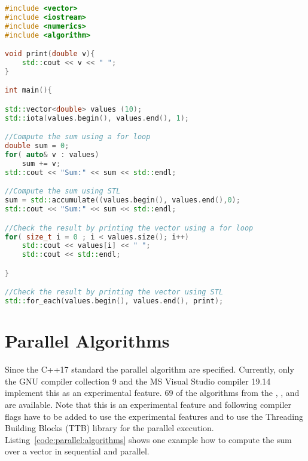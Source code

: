 \begin{lstlisting}[language=c++,caption={Example for a function definition to compute the maximum of two numbers.\label{code:algorithms:showcase}},float,floatplacement=tbp]
#include <vector> 
#include <iostream>
#include <numerics>
#include <algorithm>

void print(double v){
	std::cout << v << " ";
}

int main(){

std::vector<double> values (10);
std::iota(values.begin(), values.end(), 1);

//Compute the sum using a for loop
double sum = 0;
for( auto& v : values)
	sum += v;
std::cout << "Sum:" << sum << std::endl;

//Compute the sum using STL 
sum = std::accumulate((values.begin(), values.end(),0);
std::cout << "Sum:" << sum << std::endl;

//Check the result by printing the vector using a for loop
for( size_t i = 0 ; i < values.size(); i++)
	std::cout << values[i] << " ";
	std::cout << std::endl;

}

//Check the result by printing the vector using STL
std::for_each(values.begin(), values.end(), print);
\end{lstlisting}



\section{Parallel Algorithms}
\label{sec:stl:parallel:algorithms}
Since the C++17 standard the parallel algorithm are specified. Currently, only the GNU compiler collection 9 and the MS Visual Studio compiler 19.14 implement this as an experimental feature. 69 of the algorithms from the , , and  are available. Note that this is an experimental feature and following compiler flags have to be added  to use the experimental features and  to use the Threading Building Blocks (TTB) library for the parallel execution. Listing~\ref{code:parallel:algorithms} shows one example how to compute the sum over a vector in sequential and parallel.\\

